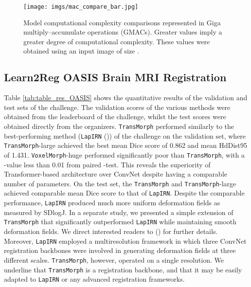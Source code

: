 \documentclass[times,twocolumn,final]{elsarticle}
\begin{document}
\begin{figure*}[!t]
\centering
\texttt{[image: imgs/mac\_compare\_bar.jpg]}
\caption{Model computational complexity comparisons represented in Giga multiply–accumulate operations (GMACs). Greater values imply a greater degree of computational complexity. These values were obtained using an input image of size .  \label{fig:MACs_compare}}
\end{figure*}

\subsection{Learn2Reg OASIS Brain MRI Registration}
Table \ref{tab:table_res_OASIS} shows the quantitative results of the validation and test sets of the challenge. The validation scores of the various methods were obtained from the leaderboard of the challenge, whilst the test scores were obtained directly from the organizers. \texttt{TransMorph} performed similarly to the best-performing method (\texttt{LapIRN} (\cite{mok2021conditional})) of the challenge on the validation set, where \texttt{TransMorph}-large achieved the best mean Dice score of 0.862 and mean HdDist95 of 1.431. \texttt{VoxelMorph}-huge performed significantly poor than \texttt{TransMorph}, with a -value less than 0.01 from paired -test. This reveals the superiority of Transformer-based architecture over ConvNet despite having a comparable number of parameters. On the test set, the \texttt{TransMorph} and \texttt{TransMorph}-large achieved comparable mean Dice score to that of \texttt{LapIRN}. Despite the comparable performance, \texttt{LapIRN} produced much more uniform deformation fields as measured by SDlogJ. In a separate study, we presented a simple extension of \texttt{TransMorph} that significantly outperformed \texttt{LapIRN} while maintaining smooth deformation fields. We direct interested readers to (\cite{chen2022unsupervised}) for further details. Moreover, \texttt{LapIRN} employed a multiresolution framework in which three ConvNet registration backbones were involved in generating deformation fields at three different scales. \texttt{TransMorph}, however, operated on a single resolution. We underline that \texttt{TransMorph} is a registration backbone, and that it may be easily adapted to \texttt{LapIRN} or any advanced registration frameworks.
\end{document}
